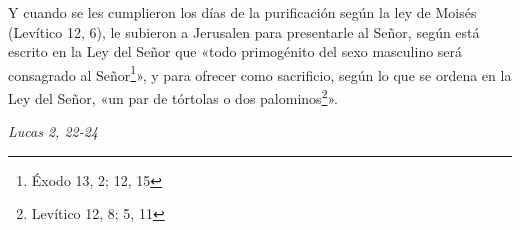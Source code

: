 \documentclass[../../devocionario.tex]{subfiles}
\begin{document}
    Y cuando se les cumplieron los días de la purificación según la ley de Moisés (Levítico 12, 6), 
    le subieron a Jerusalen para presentarle al Señor, según está escrito en la Ley del Señor que «todo primogénito 
    del sexo masculino será consagrado al Señor\footnote{Éxodo 13, 2; 12, 15\label{primogenito}}», y para ofrecer como sacrificio, 
    según lo que se ordena en la Ley del Señor, «un par de tórtolas o dos palominos\footnote{Levítico 12, 8; 5, 11\label{sacrificio}}». 
    \begin{flushright}
        \emph{Lucas 2, 22-24}
    \end{flushright}
\end{document}
